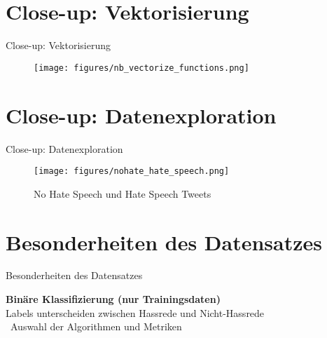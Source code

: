 \documentclass[aspectratio=169]{beamer} %
\begin{document}
\section{Close-up: Vektorisierung}
\begin{frame}{Close-up: Vektorisierung}
    \begin{figure}[h!]
        \centering
        \texttt{[image: figures/nb\_vectorize\_functions.png]} %
        \label{fig:yourimage}
    \end{figure}
\end{frame}


\section{Close-up: Datenexploration}

\begin{frame}{Close-up: Datenexploration}
\begin{figure}[ht]
    \centering
    \texttt{[image: figures/nohate\_hate\_speech.png]} %
    \caption{No Hate Speech und Hate Speech Tweets } 
    \label{fig:meinbild}
\end{figure}
\end{frame}

\section{Besonderheiten des Datensatzes}
\begin{frame}{Besonderheiten des Datensatzes}
    \begin{minipage}[t][0.9\textheight][t]{0.28\textwidth}
        \vspace{0.6cm} %
        \textbf{Binäre Klassifizierung (nur Trainingsdaten)}
        \vspace{0.75cm} %
        \\
        Labels unterscheiden zwischen Hassrede und Nicht-Hassrede
        \\
        [1.45cm]
        \textrightarrow\ Auswahl der Algorithmen und Metriken 
    \end{minipage}
\end{frame}
\end{document}
